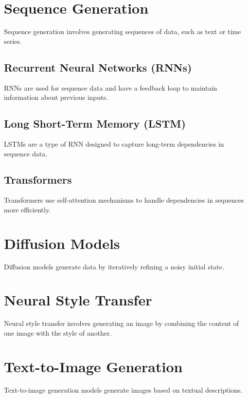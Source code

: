 \section{Sequence Generation}
Sequence generation involves generating sequences of data, such as text or time series.

\subsection{Recurrent Neural Networks (RNNs)}
RNNs are used for sequence data and have a feedback loop to maintain information about previous inputs.

\subsection{Long Short-Term Memory (LSTM)}
LSTMs are a type of RNN designed to capture long-term dependencies in sequence data.

\subsection{Transformers}
Transformers use self-attention mechanisms to handle dependencies in sequences more efficiently.

\section{Diffusion Models}
Diffusion models generate data by iteratively refining a noisy initial state.

\section{Neural Style Transfer}
Neural style transfer involves generating an image by combining the content of one image with the style of another.

\section{Text-to-Image Generation}
Text-to-image generation models generate images based on textual descriptions.
